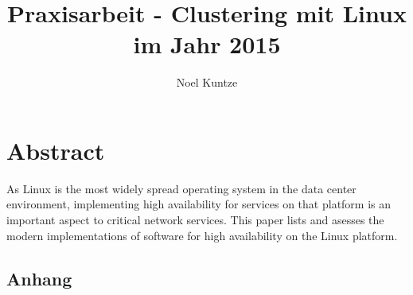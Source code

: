 \documentclass[a4paper]{article}
\begin{document}
\title{Praxisarbeit - Clustering mit Linux im Jahr 2015}
\author{Noel Kuntze }
\maketitle

\newpage
\tableofcontents
\setcounter{tocdepth}{2}

\newpage
\listoffigures

\newpage

\section*{Abstract}
As Linux is the most widely spread operating system in the data center environment,
implementing high availability for services on that platform is an important aspect to
critical network services. This paper lists and asesses the modern implementations
of software for high availability on the Linux platform.

\newpage
















\newpage

\nocite{*}
{}
\printbibliography

\newpage

\begin{appendix}

\section{Anhang}
\end{appendix}
\end{document}
